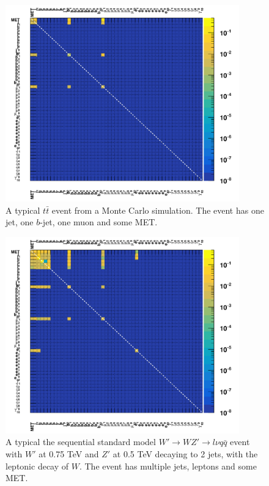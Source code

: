 \begin{figure}[H]
    \begin{center}
        \includegraphics[width=0.9\textwidth]{figs/app/validate_event1_ttbar.pdf}
    \end{center}
    \caption{
    A typical $t\bar{t}$  event from a Monte Carlo simulation.
    The event has one jet, one $b$-jet, one muon and some  MET.
    }
    \label{fig:rmm_tt1}
\end{figure}

\begin{figure}[H]
    \begin{center}
        \includegraphics[width=0.9\textwidth]{figs/app/validate_event1_ssm.pdf}
    \end{center}
    \caption{
    A typical the sequential standard model $W'\to W Z' \to l\nu q\bar{q}$  event with $W'$ at 0.75 TeV and $Z'$ at 0.5 TeV 
    decaying to 2 jets, with the leptonic decay of $W$.
    The event has multiple jets, leptons and some  MET.
    }
    \label{fig:rmm_tt2}
\end{figure}

